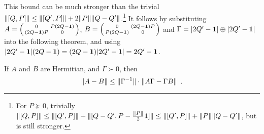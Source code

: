 \documentclass[preprintnumbers,11pt,onecolumn]{article}
\begin{document}
\noindent
This bound can be much stronger than the trivial ${\| [Q, P] \|} \leq {\| [Q', P] \|} + 2 {\| P \|} {\| Q - Q' \|}$.\footnote{For $P \succeq 0$, trivially ${\| [Q, P] \|} \leq {\| [Q', P] \|} + {\| [Q - Q', P - \tfrac{{\| P \|}}{2} \boldsymbol{1}] \|} \leq {\| [Q', P] \|} + {\| P \|} {\| Q - Q' \|}$, but  is still stronger.}  It follows by substituting $A = \Big(\begin{smallmatrix}0 & P (2 Q - \boldsymbol{1}) \\ (2Q - \boldsymbol{1}) P & 0\end{smallmatrix}\Big)$, $B = \Big(\begin{smallmatrix}0 & (2 Q - \boldsymbol{1}) P \\ P (2 Q - \boldsymbol{1}) & 0\end{smallmatrix}\Big)$ and $\Gamma = {\lvert 2 Q' - \boldsymbol{1}\rvert} \oplus {\lvert 2 Q' - \ensuremath{\boldsymbol{1}}\rvert}$ into the following theorem, and using ${\lvert 2 Q' - \boldsymbol{1}\rvert} (2 Q - \boldsymbol{1}) = (2 Q - \boldsymbol{1}) {\lvert 2 Q' - \boldsymbol{1}\rvert} = 2 Q' - \boldsymbol{1}$.  

\begin{theorem} \label{t:bhatiaroundingeigenvalues}
If $A$ and $B$ are Hermitian, and $\Gamma \succ 0$, then 
\begin{equation*}
{\| A - B \|} \leq {\| \Gamma^{-1} \|} \cdot {\| A \Gamma - \Gamma B \|}
 \enspace .
\end{equation*}
\end{theorem}
\end{document}
